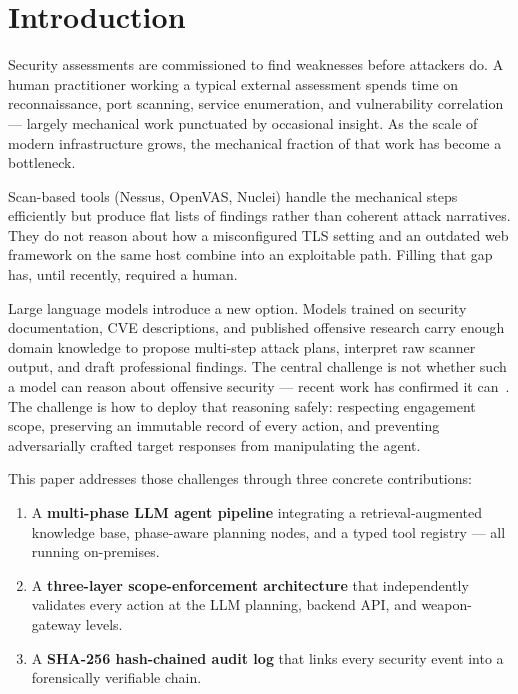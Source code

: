 \documentclass[conference]{IEEEtran}
\begin{document}
\section{Introduction}

Security assessments are commissioned to find weaknesses before attackers
do. A human practitioner working a typical external assessment spends
time on reconnaissance, port scanning, service enumeration, and
vulnerability correlation — largely mechanical work punctuated by
occasional insight. As the scale of modern infrastructure grows,
the mechanical fraction of that work has become a bottleneck.

Scan-based tools (Nessus, OpenVAS, Nuclei) handle the mechanical steps
efficiently but produce flat lists of findings rather than coherent
attack narratives. They do not reason about how a misconfigured TLS
setting and an outdated web framework on the same host combine into an
exploitable path. Filling that gap has, until recently, required a human.

Large language models introduce a new option. Models trained on security
documentation, CVE descriptions, and published offensive research
carry enough domain knowledge to propose multi-step attack plans,
interpret raw scanner output, and draft professional findings.
The central challenge is not whether such a model can reason about
offensive security — recent work has confirmed it can~\cite{happe2023,deng2023}.
The challenge is how to deploy that reasoning safely: respecting engagement
scope, preserving an immutable record of every action, and preventing
adversarially crafted target responses from manipulating the agent.

This paper addresses those challenges through three concrete contributions:

\begin{enumerate}
\item A \textbf{multi-phase LLM agent pipeline} integrating a
  retrieval-augmented knowledge base, phase-aware planning nodes,
  and a typed tool registry — all running on-premises.
\item A \textbf{three-layer scope-enforcement architecture} that
  independently validates every action at the LLM planning,
  backend API, and weapon-gateway levels.
\item A \textbf{SHA-256 hash-chained audit log} that links every
  security event into a forensically verifiable chain.
\end{enumerate}
\end{document}
